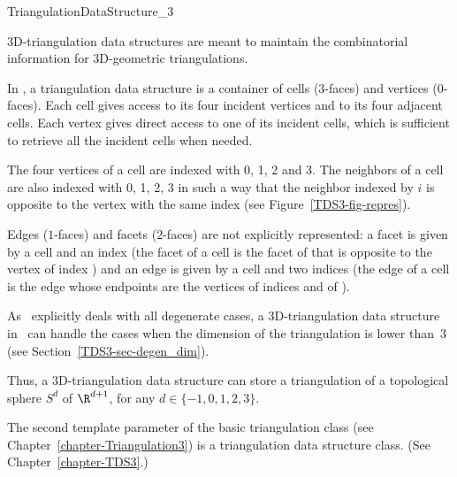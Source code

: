 

\begin{ccRefConcept}{TriangulationDataStructure_3}


\ccDefinition

3D-triangulation data structures are meant to maintain the
combinatorial information for 3D-geometric triangulations.

In \cgal, a triangulation data structure is a
container of cells ($3$-faces) and vertices ($0$-faces). Each cell gives
access to its four incident vertices and to its four adjacent
cells. Each vertex gives direct access to one of its incident cells, which is 
sufficient to retrieve all the incident cells when needed.

The four vertices of a cell are indexed with 0, 1, 2 and 3.  The
neighbors of a cell are also indexed with 0, 1, 2, 3 
in such a way that the neighbor indexed by $i$ is opposite to the vertex
with the same index (see Figure~\ref{TDS3-fig-repres}).

Edges ($1$-faces) and facets ($2$-faces) are not explicitly
represented: a facet is given by a cell and an index (the facet
 of a cell  is the facet of  that is opposite to
the vertex of index ) and an edge is given by a cell and two
indices (the edge  of a cell  is the edge
whose endpoints are the vertices of indices  and  of
). 

As \cgal\ explicitly deals with all degenerate cases, a
3D-triangulation data structure in \cgal\ can handle the cases when
the dimension of the triangulation is lower than~3 
(see Section~\ref{TDS3-sec-degen_dim}).

Thus, a 3D-triangulation data structure can store a triangulation of a
topological sphere $S^d$ of $\R^{d+1}$, for any $d \in \{-1,0,1,2,3\}$. 

\bigskip

The second template parameter of the basic triangulation class 
(see Chapter~\ref{chapter-Triangulation3})
 is a triangulation 
data structure class. (See Chapter~\ref{chapter-TDS3}.)  


\end{ccRefConcept}
